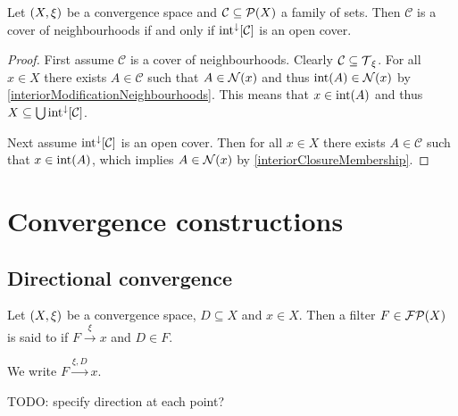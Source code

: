 \begin{lemma}
Let $\left( X,\xi \right)$ be a convergence space and $\mathcal{C}\subseteq \operatorname{\mathcal{P}}(X)$ a family of sets. Then $\mathcal{C}$ is a cover of neighbourhoods \textup{if and only if} $\operatorname{int}^\downarrow[\mathcal{C}]$ is an open cover.
\end{lemma}
\begin{proof}
First assume $\mathcal{C}$ is a cover of neighbourhoods. Clearly $\mathcal{C} \subseteq \operatorname{\mathcal{T}}_\xi$. For all $x\in X$ there exists $A\in \mathcal{C}$ such that $A\in \operatorname{\mathcal{N}}(x)$ and thus $\operatorname{int}(A) \in \operatorname{\mathcal{N}}(x)$ by \ref{interiorModificationNeighbourhoods}. This means that $x\in \operatorname{int}(A)$ and thus $X\subseteq \bigcup\operatorname{int}^\downarrow[\mathcal{C}]$.

Next assume $\operatorname{int}^\downarrow[\mathcal{C}]$ is an open cover. Then for all $x\in X$ there exists $A\in \mathcal{C}$ such that $x\in \operatorname{int}(A)$, which implies $A\in \operatorname{\mathcal{N}}(x)$ by \ref{interiorClosureMembership}.
\end{proof}

\section{Convergence constructions}
\subsection{Directional convergence}
\begin{definition}
Let $\left( X,\xi \right)$ be a convergence space, $D\subseteq X$ and $x\in X$. Then a filter $F\in \operatorname{\mathcal{FP}}(X)$ is said to  if $F\overset{\xi}{\longrightarrow} x$ and $D\in F$.

We write $F\overset{\xi, D}{\longrightarrow} x$.
\end{definition}
TODO: specify direction at each point?

